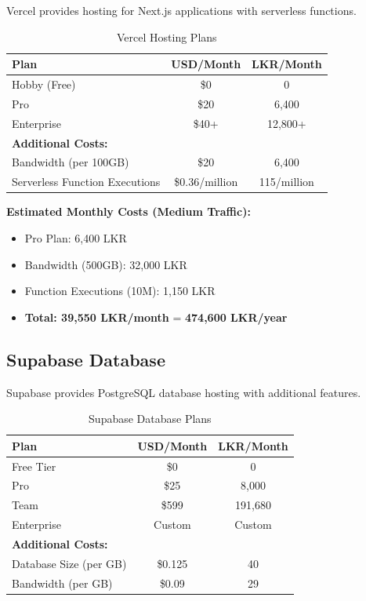 \documentclass[12pt,a4paper]{article}
\begin{document}
Vercel provides hosting for Next.js applications with serverless functions.

\begin{table}[H]
\centering
\begin{tabular}{|l|c|c|}
\hline
\textbf{Plan} & \textbf{USD/Month} & \textbf{LKR/Month} \\
\hline
Hobby (Free) & \$0 & 0 \\
Pro & \$20 & 6,400 \\
Enterprise & \$40+ & 12,800+ \\
\hline
\textbf{Additional Costs:} & & \\
Bandwidth (per 100GB) & \$20 & 6,400 \\
Serverless Function Executions & \$0.36/million & 115/million \\
\hline
\end{tabular}
\caption{Vercel Hosting Plans}
\end{table}

\textbf{Estimated Monthly Costs (Medium Traffic):}
\begin{itemize}
    \item Pro Plan: 6,400 LKR
    \item Bandwidth (500GB): 32,000 LKR
    \item Function Executions (10M): 1,150 LKR
    \item \textbf{Total: 39,550 LKR/month} = \textbf{474,600 LKR/year}
\end{itemize}

\subsection{Supabase Database}

Supabase provides PostgreSQL database hosting with additional features.

\begin{table}[H]
\centering
\begin{tabular}{|l|c|c|}
\hline
\textbf{Plan} & \textbf{USD/Month} & \textbf{LKR/Month} \\
\hline
Free Tier & \$0 & 0 \\
Pro & \$25 & 8,000 \\
Team & \$599 & 191,680 \\
Enterprise & Custom & Custom \\
\hline
\textbf{Additional Costs:} & & \\
Database Size (per GB) & \$0.125 & 40 \\
Bandwidth (per GB) & \$0.09 & 29 \\
\hline
\end{tabular}
\caption{Supabase Database Plans}
\end{table}
\end{document}
